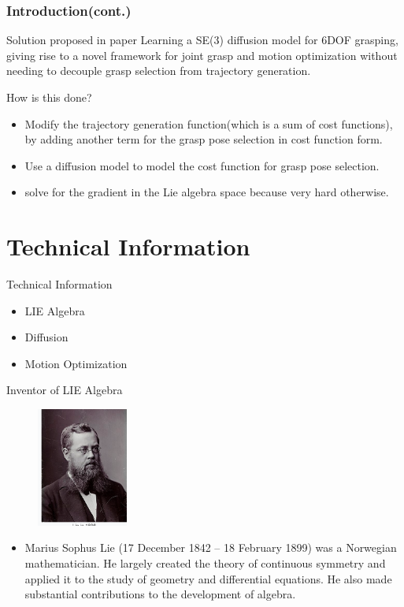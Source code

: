 \documentclass{beamer}
\begin{document}
\begin{frame}\frametitle{Introduction(cont.)} 
\begin{block}{Solution proposed in paper}
Learning a SE(3) diffusion model for 6DOF grasping, giving rise to a novel framework for joint grasp and motion optimization without needing to decouple grasp selection from trajectory generation. 
\end{block}
\end{frame}    


\begin{frame}{How is this done?}
\begin{itemize}
\item Modify the trajectory generation function(which is a sum of cost functions), by adding another term for the grasp pose selection in cost function form.
\item Use a diffusion model to model the cost function for grasp pose selection.
\item solve for the gradient in the Lie algebra space because very hard otherwise.
\end{itemize}
\end{frame}


\section{Technical Information}
\begin{frame}{Technical Information}
\begin{itemize}
\item LIE Algebra
\item Diffusion
\item Motion Optimization
\end{itemize}  
\end{frame}


\begin{frame}{Inventor of LIE Algebra}
\begin{figure}
\includegraphics[width=3cm]{lie.png}
\end{figure}
\begin{itemize}
    \item Marius Sophus Lie (17 December 1842 – 18 February 1899) was a Norwegian mathematician. He largely created the theory of continuous symmetry and applied it to the study of geometry and differential equations. He also made substantial contributions to the development of algebra.
\end{itemize}
\end{frame}
\end{document}
